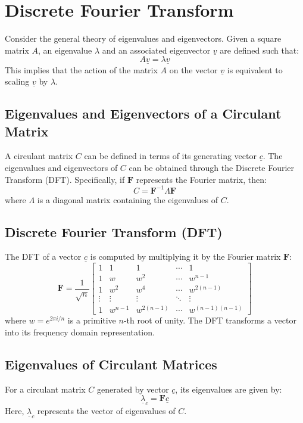 \section{Discrete Fourier Transform}

Consider the general theory of eigenvalues and eigenvectors. Given a square matrix \( A \), an eigenvalue \( \lambda \) and an associated eigenvector \( \underline{v} \) are defined such that:
\[
A \underline{v} = \lambda \underline{v}
\]
This implies that the action of the matrix \( A \) on the vector \( \underline{v} \) is equivalent to scaling \( \underline{v} \) by \( \lambda \).

\subsection*{Eigenvalues and Eigenvectors of a Circulant Matrix}
A circulant matrix \( C \) can be defined in terms of its generating vector \( \underline{c} \). The eigenvalues and eigenvectors of \( C \) can be obtained through the Discrete Fourier Transform (DFT). Specifically, if \( \mathbf{F} \) represents the Fourier matrix, then:
\[
C = \mathbf{F}^{-1} \Lambda \mathbf{F}
\]
where \( \Lambda \) is a diagonal matrix containing the eigenvalues of \( C \).

\subsection*{Discrete Fourier Transform (DFT)}
The DFT of a vector \( \underline{c} \) is computed by multiplying it by the Fourier matrix \( \mathbf{F} \):
\[
\mathbf{F} = \frac{1}{\sqrt{n}} \begin{bmatrix}
1 & 1 & 1 & \cdots & 1 \\
1 & w & w^2 & \cdots & w^{n-1} \\
1 & w^2 & w^4 & \cdots & w^{2(n-1)} \\
\vdots & \vdots & \vdots & \ddots & \vdots \\
1 & w^{n-1} & w^{2(n-1)} & \cdots & w^{(n-1)(n-1)}
\end{bmatrix}
\]
where \( w = e^{2\pi i / n} \) is a primitive \( n \)-th root of unity. The DFT transforms a vector into its frequency domain representation.

\subsection*{Eigenvalues of Circulant Matrices}
For a circulant matrix \( C \) generated by vector \( \underline{c} \), its eigenvalues are given by:
\[
\underline{\lambda}_c = \mathbf{F} \underline{c}
\]
Here, \( \underline{\lambda}_c \) represents the vector of eigenvalues of \( C \).


